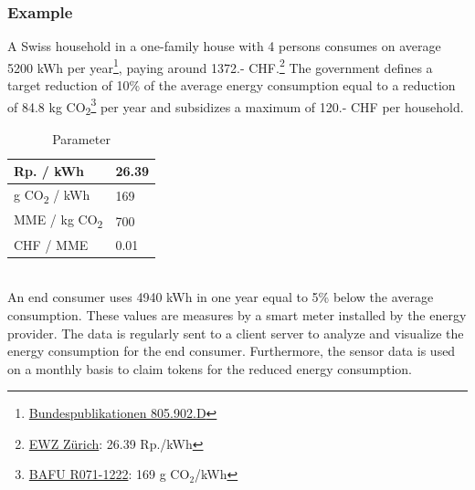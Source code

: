 \documentclass[11pt]{article}
\begin{document}
\subsubsection{Example}
A Swiss household in a one-family house with 4 persons consumes on average 5200 kWh per year\footnote{\href{https://www.bundespublikationen.admin.ch/cshop_mimes_bbl/2C/2C59E545D7371ED5BB89418480F1B62D.pdf}{Bundespublikationen 805.902.D}}, paying around 1372.- CHF.\footnote{\href{https://www.ewz.ch/content/dam/ewz/services/dokumentencenter/energie-beziehen/dokumente/gruener-strom-fuer-mein-zuhause/stromtarif-2018-zh-private.pdf}{EWZ Zürich}: 26.39 Rp./kWh} The government defines a target reduction of 10\% of the average energy consumption equal to a reduction of 84.8 kg CO\textsubscript{2}\footnote{\href{https://www.bafu.admin.ch/bafu/de/home/suche.html\#R071-1222}{BAFU R071-1222}: 169 g CO$_2$/kWh} per year and subsidizes a maximum of 120.- CHF per household.
\begin{table}[h]
\begin{center}
\begin{tabular}{ll}
Rp. / kWh & 26.39 \\ \hline
g CO\textsubscript{2} / kWh                                                                                                                               & 169 \\ \hline
MME / kg CO\textsubscript{2}                                                                                                                                   & 700  \\ \hline
CHF / MME                                                                                                                                       & 0.01
\end{tabular}
\caption{Parameter}
\label{table_parameter}
\end{center}
\end{table}
\\
An end consumer uses 4940 kWh in one year equal to 5\% below the average consumption. These values are measures by a smart meter installed by the energy provider. The data is regularly sent to a client server to analyze and visualize the energy consumption for the end consumer. Furthermore, the sensor data is used on a monthly basis to claim tokens for the reduced energy consumption.
\end{document}
